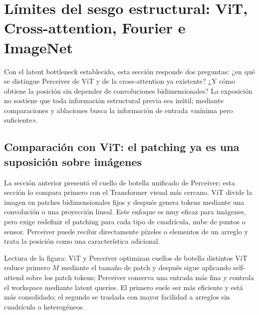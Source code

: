 \section{Límites del sesgo estructural: ViT, Cross-attention, Fourier e ImageNet}

Con el latent bottleneck establecido, esta sección responde dos preguntas: ¿en qué se distingue Perceiver de ViT y de la cross-attention ya existente? ¿Y cómo obtiene la posición sin depender de convoluciones bidimensionales? La exposición no sostiene que toda información estructural previa sea inútil; mediante comparaciones y ablaciones busca la información de entrada «mínima pero suficiente».

\subsection{Comparación con ViT: el patching ya es una suposición sobre imágenes}

La sección anterior presentó el cuello de botella unificado de Perceiver; esta sección lo compara primero con el Transformer visual más cercano. ViT divide la imagen en patches bidimensionales fijos y después genera tokens mediante una convolución o una proyección lineal. Este enfoque es muy eficaz para imágenes, pero exige redefinir el patching para cada tipo de cuadrícula, nube de puntos o sensor. Perceiver puede recibir directamente píxeles o elementos de un arreglo y trata la posición como una característica adicional.


\begin{knowledgebox}{Lectura de la figura: ViT y Perceiver optimizan cuellos de botella distintos}
ViT reduce primero $M$ mediante el tamaño de patch y después sigue aplicando self-attend sobre los patch tokens; Perceiver conserva una entrada más fina y controla el workspace mediante latent queries. El primero suele ser más eficiente y está más consolidado; el segundo se traslada con mayor facilidad a arreglos sin cuadrícula o heterogéneos.
\end{knowledgebox}



